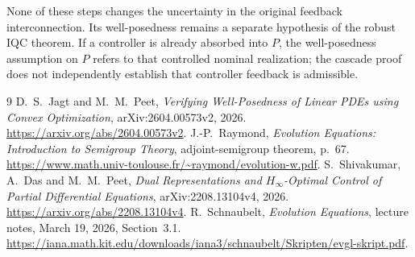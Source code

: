 \documentclass[11pt,a4paper]{article}
\begin{document}
None of these steps changes the uncertainty in the original feedback
interconnection. Its well-posedness remains a separate hypothesis of the
robust IQC theorem. If a controller is already absorbed into $P$, the
well-posedness assumption on $P$ refers to that controlled nominal
realization; the cascade proof does not independently establish that
controller feedback is admissible.

\begin{thebibliography}{9}
D.~S.~Jagt and M.~M.~Peet,
\emph{Verifying Well-Posedness of Linear PDEs using Convex Optimization},
arXiv:2604.00573v2, 2026.
\url{https://arxiv.org/abs/2604.00573v2}.
J.-P.~Raymond,
\emph{Evolution Equations: Introduction to Semigroup Theory},
adjoint-semigroup theorem, p.~67.
\url{https://www.math.univ-toulouse.fr/~raymond/evolution-w.pdf}.
S.~Shivakumar, A.~Das and M.~M.~Peet,
\emph{Dual Representations and $H_\infty$-Optimal Control of
Partial Differential Equations}, arXiv:2208.13104v4, 2026.
\url{https://arxiv.org/abs/2208.13104v4}.
R.~Schnaubelt, \emph{Evolution Equations}, lecture notes,
March 19, 2026, Section~3.1.
\url{https://iana.math.kit.edu/downloads/iana3/schnaubelt/Skripten/evgl-skript.pdf}.
\end{thebibliography}
\end{document}
